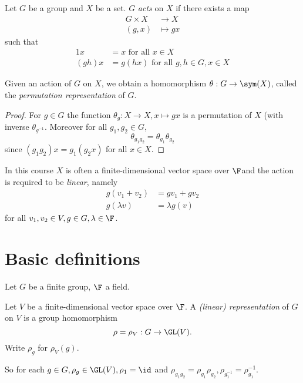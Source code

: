 \documentclass[a4paper]{article}
\theoremstyle{definition}
\begin{document}
\begin{definition}
  Let \(G\) be a group and \(X\) be a set. \(G\) \emph{acts} on \(X\) if there exists a map
  \begin{align*}
    G \times X &\to X \\
    (g, x) &\mapsto gx
  \end{align*}
  such that
  \begin{align*}
    1x &= x \text{ for all } x \in X \\
    (gh) x &= g (hx) \text{ for all } g, h \in G, x \in X
  \end{align*}
\end{definition}

\begin{proposition}
  Given an action of \(G\) on \(X\), we obtain a homomorphism \(\theta: G \to \sym(X)\), called the \emph{permutation representation} of \(G\).
\end{proposition}

\begin{proof}
  For \(g \in G\) the function \(\theta_g: X \to X, x \mapsto gx\) is a permutation of \(X\) (with inverse \(\theta_{g^{-1}}\). Moreover for all \(g_1, g_2 \in G\),
  \[
    \theta_{g_1 g_2} = \theta_{g_1} \theta_{g_2}
  \]
  since \((g_1g_2)x = g_1(g_2x)\) for all \(x \in X\).
\end{proof}

In this course \(X\) is often a finite-dimensional vector space over \(\F\)and the action is required to be \emph{linear}, namely
\begin{align*}
  g(v_1 + v_2) &= gv_1 + gv_2 \\
  g(\lambda v) &= \lambda g(v)
\end{align*}
for all \(v_1, v_2 \in V, g \in G, \lambda \in \F\).

\section{Basic definitions}

Let \(G\) be a finite group, \(\F\) a field.

\begin{definition}[representation]
  Let \(V\) be a finite-dimensional vector space over \(\F\). A \emph{(linear) representation} of \(G\) on \(V\) is a group homomorphism
  \[
    \rho = \rho_V: G \to \GL(V).
  \]
  Write \(\rho_g\) for \(\rho_V(g)\).
\end{definition}
So for each \(g \in G, \rho_g \in \GL(V), \rho_1 = \id\) and \(\rho_{g_1g_2} = \rho_{g_1}\rho_{g_2}, \rho_{g_1^{-1}} = \rho_{g_1}^{-1}\).
\end{document}
